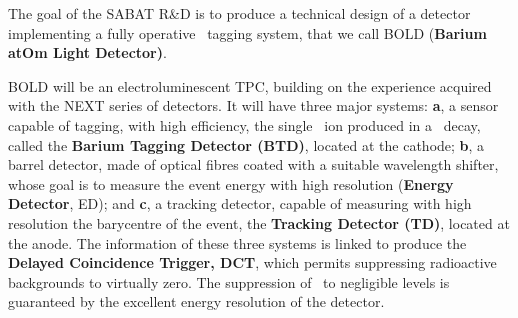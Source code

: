 \documentclass[a4paper,11pt]{article}
\begin{document}
%
The goal of the SABAT R\&D is to produce a technical design of a 
detector implementing a fully operative \Bapp\ tagging system, that we call BOLD ({\bf Barium atOm Light Detector)}. 

BOLD will be an electroluminescent TPC, building on the experience acquired with the NEXT series of detectors. It will have three major systems: \textbf{a}, a sensor capable of tagging, with high efficiency, the single \Bapp\ ion produced in a \bbonu\ decay, called the {\bf Barium Tagging Detector (BTD)}, located at the cathode; \textbf{b}, a barrel detector, made of optical fibres coated with a suitable wavelength shifter, whose goal is to measure the event energy with high resolution ({\bf Energy Detector}, ED); and \textbf{c}, a tracking detector, capable of measuring with high resolution the barycentre of the event, the {\bf Tracking Detector (TD)}, located at the anode. The information of these three systems is linked to produce the {\bf Delayed Coincidence Trigger, DCT}, which permits suppressing radioactive backgrounds to virtually zero. The suppression of \bbtnu\ to negligible levels is guaranteed by the excellent energy resolution of the detector. 
\end{document}
